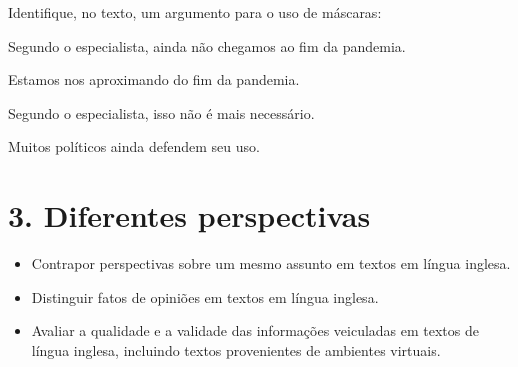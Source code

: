 Identifique, no texto, um argumento para o uso de máscaras:

\begin{escolha}
\item Segundo o especialista, ainda não chegamos ao fim da pandemia.

\item Estamos nos aproximando do fim da pandemia.

\item Segundo o especialista, isso não é mais necessário.

\item Muitos políticos ainda defendem seu uso.
\end{escolha}


\chapter{3. Diferentes perspectivas}



\begin{itemize}
\item Contrapor perspectivas sobre um mesmo assunto em textos em língua
inglesa.

\item Distinguir fatos de opiniões em textos em língua inglesa.

\item Avaliar a qualidade e a validade das informações veiculadas em textos
de língua inglesa, incluindo textos provenientes de ambientes virtuais.
\end{itemize}

